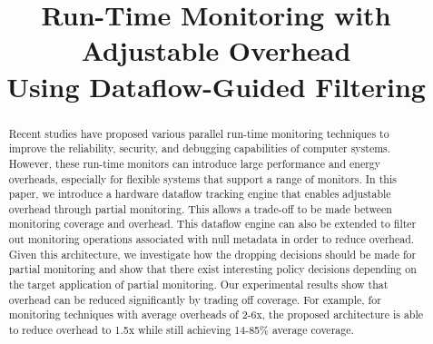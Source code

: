 \title{Run-Time Monitoring with Adjustable Overhead \\Using Dataflow-Guided Filtering}

{\author{
}
}
\IEEEspecialpapernotice{\vspace{-0.4in}}

\maketitle

\thispagestyle{empty}

\begin{abstract}

Recent studies have proposed various parallel run-time monitoring techniques to
improve the reliability, security, and debugging capabilities of computer
systems. However, these run-time monitors can introduce large performance and energy
overheads, especially for flexible systems that support a range of monitors.
In this paper, we introduce a hardware dataflow tracking engine that enables
adjustable overhead through partial monitoring. This allows a trade-off to be
made between monitoring coverage and overhead. This dataflow engine
can also be extended to filter out monitoring operations associated with null
metadata in order to reduce overhead.
Given this architecture, we investigate how the dropping decisions should be
made for partial monitoring and show that there exist interesting policy
decisions depending on the target application of partial monitoring.
Our experimental results show that overhead can be reduced significantly 
by trading off coverage. For example, for monitoring techniques with average
overheads of 2-6x, the proposed architecture is able to reduce overhead to
1.5x while still achieving 14-85\% average coverage. 

\end{abstract}
